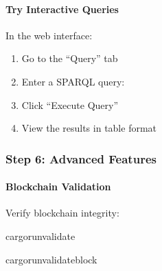 \documentclass[letterpaper,10pt,english]{sphinxmanual}
\begin{document}
\paragraph{Try Interactive Queries}
\label{\detokenize{tutorials/first-supply-chain:try-interactive-queries}}
\sphinxAtStartPar
In the web interface:
\begin{enumerate}
%
\item {} 
\sphinxAtStartPar
Go to the “Query” tab

\item {} 
\sphinxAtStartPar
Enter a SPARQL query:

\begin{sphinxVerbatim}[commandchars=\\\{\}]
     
     
           
           
\end{sphinxVerbatim}

\item {} 
\sphinxAtStartPar
Click “Execute Query”

\item {} 
\sphinxAtStartPar
View the results in table format

\end{enumerate}


\subsubsection{Step 6: Advanced Features}
\label{\detokenize{tutorials/first-supply-chain:step-6-advanced-features}}

\paragraph{Blockchain Validation}
\label{\detokenize{tutorials/first-supply-chain:blockchain-validation}}
\sphinxAtStartPar
Verify blockchain integrity:

\begin{sphinxVerbatim}[commandchars=\\\{\}]
cargorun\PYGZhy{}\PYGZhy{}validate

cargorun\PYGZhy{}\PYGZhy{}validate\PYGZhy{}\PYGZhy{}block
\end{sphinxVerbatim}
\end{document}
